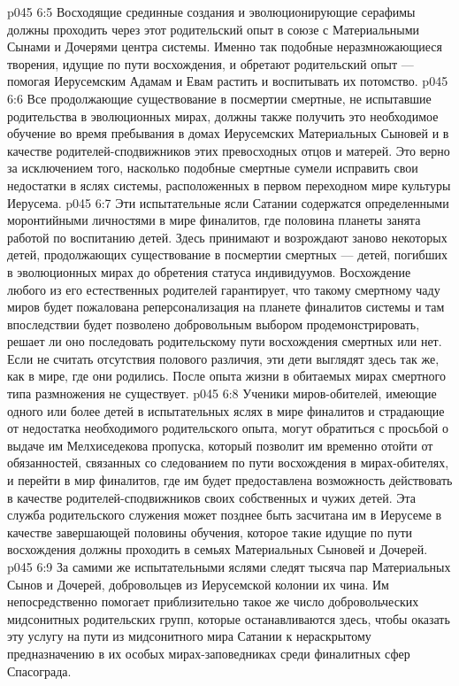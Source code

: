 \vs p045 6:5 Восходящие срединные создания и эволюционирующие серафимы должны проходить через этот родительский опыт в союзе с Материальными Сынами и Дочерями центра системы. Именно так подобные неразмножающиеся творения, идущие по пути восхождения, и обретают родительский опыт --- помогая Иерусемским Адамам и Евам растить и воспитывать их потомство.
\vs p045 6:6 Все продолжающие существование в посмертии смертные, не испытавшие родительства в эволюционных мирах, должны также получить это необходимое обучение во время пребывания в домах Иерусемских Материальных Сыновей и в качестве родителей\hyp{}сподвижников этих превосходных отцов и матерей. Это верно за исключением того, насколько подобные смертные сумели исправить свои недостатки в яслях системы, расположенных в первом переходном мире культуры Иерусема.
\vs p045 6:7 \pc Эти испытательные ясли Сатании содержатся определенными моронтийными личностями в мире финалитов, где половина планеты занята работой по воспитанию детей. Здесь принимают и возрождают заново некоторых детей, продолжающих существование в посмертии смертных --- детей, погибших в эволюционных мирах до обретения статуса индивидуумов. Восхождение любого из его естественных родителей гарантирует, что такому смертному чаду миров будет пожалована реперсонализация на планете финалитов системы и там впоследствии будет позволено добровольным выбором продемонстрировать, решает ли оно последовать родительскому пути восхождения смертных или нет. Если не считать отсутствия полового различия, эти дети выглядят здесь так же, как в мире, где они родились. После опыта жизни в обитаемых мирах смертного типа размножения не существует.
\vs p045 6:8 Ученики миров\hyp{}обителей, имеющие одного или более детей в испытательных яслях в мире финалитов и страдающие от недостатка необходимого родительского опыта, могут обратиться с просьбой о выдаче им Мелхиседекова пропуска, который позволит им временно отойти от обязанностей, связанных со следованием по пути восхождения в мирах\hyp{}обителях, и перейти в мир финалитов, где им будет предоставлена возможность действовать в качестве родителей\hyp{}сподвижников своих собственных и чужих детей. Эта служба родительского служения может позднее быть засчитана им в Иерусеме в качестве завершающей половины обучения, которое такие идущие по пути восхождения должны проходить в семьях Материальных Сыновей и Дочерей.
\vs p045 6:9 За самими же испытательными яслями следят тысяча пар Материальных Сынов и Дочерей, добровольцев из Иерусемской колонии их чина. Им непосредственно помогает приблизительно такое же число добровольческих мидсонитных родительских групп, которые останавливаются здесь, чтобы оказать эту услугу на пути из мидсонитного мира Сатании к нераскрытому предназначению в их особых мирах\hyp{}заповедниках среди финалитных сфер Спасограда.

